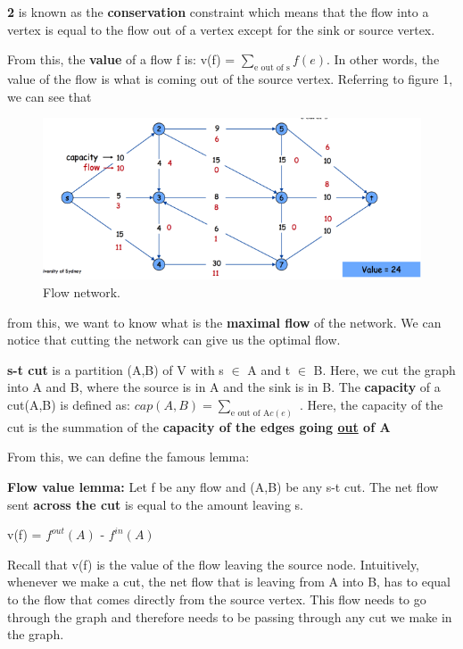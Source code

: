 \documentclass[11pt, oneside]{article}
\theoremstyle{definition}
\begin{document}
\textbf{2} is known as the \textbf{conservation} constraint which means that the flow into a vertex is equal to the flow out of a vertex except for the sink or source vertex.

From this, the \textbf{value} of a flow f is: v(f) = $\sum_{\text{e out of s}}f(e)$. In other words, the value of the flow is what is coming out of the source vertex. Referring to figure 1, we can see that
\begin{figure}
  \includegraphics{images/Week_9/FlowNetwork.jpg}
  \caption{Flow network.}
  \label{FlowNetwork}
\end{figure}
from this, we want to know what is the \textbf{maximal flow} of the network. We can notice that cutting the network can give us the optimal flow.


\textbf{s-t cut} is a partition (A,B) of V with s $\in$ A and t $\in$ B. Here, we cut the graph into A and B, where the source is in A and the sink is in B. The \textbf{capacity} of a cut(A,B) is defined as: $cap(A,B) = \sum_{\text{e out of A}c(e)}$ . Here, the capacity of the cut is the summation of the \textbf{capacity of the edges going \underline{out} of A}

From this, we can define the famous lemma:
\begin{center}
  \textbf{Flow value lemma: } Let f be any flow and (A,B) be any s-t cut. The net flow sent \textbf{across the cut} is equal to the amount leaving s.

  v(f) = $f^{out}(A)$ - $f^{in}(A)$
\end{center}
Recall that v(f) is the value of the flow leaving the source node. Intuitively, whenever we make a cut, the net flow that is leaving from A into B, has to equal to the flow that comes directly from the source vertex. This flow needs to go through the graph and therefore needs to be passing through any cut we make in the graph.
\end{document}
